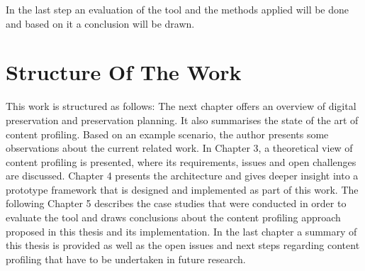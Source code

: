 In the last step an evaluation of the tool and the methods applied will be done and based on it a conclusion will be drawn.

\section{Structure Of The Work}
\label{sec:structure_of_the_work}
This work is structured as follows: The next chapter offers an overview of digital preservation and preservation planning.
It also summarises the state of the art of content profiling. Based on an example scenario, the author presents some observations about the current related work.
In Chapter 3, a theoretical view of content profiling is presented, where its requirements, issues and open challenges are discussed.
Chapter 4 presents the architecture and gives deeper insight into a prototype framework that is designed and implemented as part of this work.
The following Chapter 5 describes the case studies that were conducted in order to evaluate the tool and draws conclusions about the content profiling approach proposed in this thesis and its implementation.
In the last chapter a summary of this thesis is provided as well as the open issues and next steps regarding content profiling that have to be undertaken in future research.